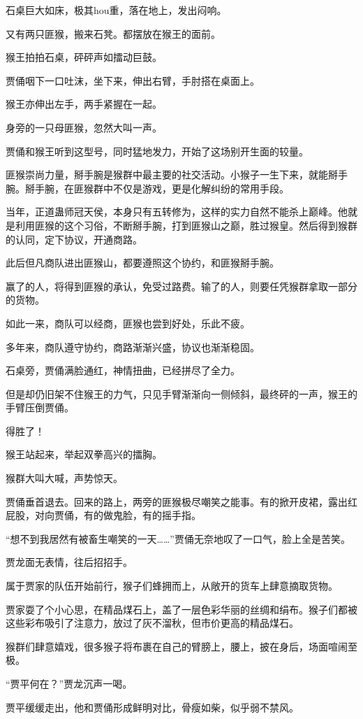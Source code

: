\begin{this_body}
石桌巨大如床，极其hou重，落在地上，发出闷响。

又有两只匪猴，搬来石凳。都摆放在猴王的面前。

猴王拍拍石桌，砰砰声如擂动巨鼓。

贾俑咽下一口吐沫，坐下来，伸出右臂，手肘搭在桌面上。

猴王亦伸出左手，两手紧握在一起。

身旁的一只母匪猴，忽然大叫一声。

贾俑和猴王听到这型号，同时猛地发力，开始了这场别开生面的较量。

匪猴崇尚力量，掰手腕是猴群中最主要的社交活动。小猴子一生下来，就能掰手腕。掰手腕，在匪猴群中不仅是游戏，更是化解纠纷的常用手段。

当年，正道蛊师冠天侯，本身只有五转修为，这样的实力自然不能杀上巅峰。他就是利用匪猴的这个习俗，不断掰手腕，打到匪猴山之巅，胜过猴皇。然后得到猴群的认同，定下协议，开通商路。

此后但凡商队进出匪猴山，都要遵照这个协约，和匪猴掰手腕。

赢了的人，将得到匪猴的承认，免受过路费。输了的人，则要任凭猴群拿取一部分的货物。

如此一来，商队可以经商，匪猴也尝到好处，乐此不疲。

多年来，商队遵守协约，商路渐渐兴盛，协议也渐渐稳固。

石桌旁，贾俑满脸通红，神情扭曲，已经拼尽了全力。

但是却仍旧架不住猴王的力气，只见手臂渐渐向一侧倾斜，最终砰的一声，猴王的手臂压倒贾俑。

得胜了！

猴王站起来，举起双拳高兴的擂胸。

猴群大叫大喊，声势惊天。

贾俑垂首退去。回来的路上，两旁的匪猴极尽嘲笑之能事。有的掀开皮裙，露出红屁股，对向贾俑，有的做鬼脸，有的摇手指。

“想不到我居然有被畜生嘲笑的一天……”贾俑无奈地叹了一口气，脸上全是苦笑。

贾龙面无表情，往后招招手。

属于贾家的队伍开始前行，猴子们蜂拥而上，从敞开的货车上肆意摘取货物。

贾家耍了个小心思，在精品煤石上，盖了一层色彩华丽的丝绸和绢布。猴子们都被这些彩布吸引了注意力，放过了灰不溜秋，但市价更高的精品煤石。

猴群们肆意嬉戏，很多猴子将布裹在自己的臂膀上，腰上，披在身后，场面喧闹至极。

“贾平何在？”贾龙沉声一喝。

贾平缓缓走出，他和贾俑形成鲜明对比，骨瘦如柴，似乎弱不禁风。


\end{this_body}
